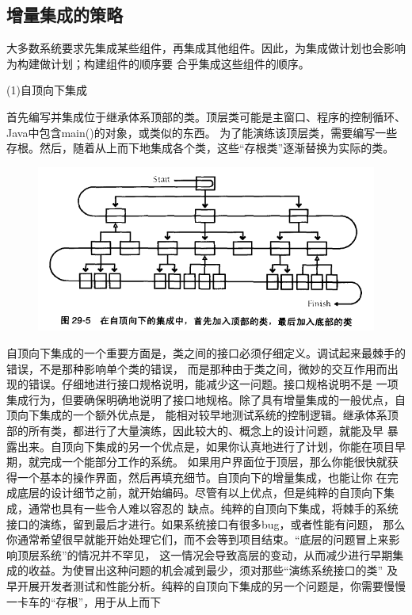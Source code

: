 \documentclass{article}
\begin{document}
\subsection{增量集成的策略}
大多数系统要求先集成某些组件，再集成其他组件。因此，为集成做计划也会影响为构建做计划；构建组件的顺序要
合乎集成这些组件的顺序。
\par
(1)自顶向下集成
\par
首先编写并集成位于继承体系顶部的类。顶层类可能是主窗口、程序的控制循环、Java中包含main()的对象，或类似的东西。
为了能演练该顶层类，需要编写一些存根。然后，随着从上而下地集成各个类，这些“存根类”逐渐替换为实际的类。
\begin{figure}[htb]
    \centering
    \includegraphics[width=15cm]{figure24.png}
\end{figure}
自顶向下集成的一个重要方面是，类之间的接口必须仔细定义。调试起来最棘手的错误，不是那种影响单个类的错误，
而是那种由于类之间，微妙的交互作用而出现的错误。仔细地进行接口规格说明，能减少这一问题。接口规格说明不是
一项集成行为，但要确保明确地说明了接口地规格。除了具有增量集成的一般优点，自顶向下集成的一个额外优点是，
能相对较早地测试系统的控制逻辑。继承体系顶部的所有类，都进行了大量演练，因此较大的、概念上的设计问题，就能及早
暴露出来。自顶向下集成的另一个优点是，如果你认真地进行了计划，你能在项目早期，就完成一个能部分工作的系统。
如果用户界面位于顶层，那么你能很快就获得一个基本的操作界面，然后再填充细节。自顶向下的增量集成，也能让你
在完成底层的设计细节之前，就开始编码。尽管有以上优点，但是纯粹的自顶向下集成，通常也具有一些令人难以容忍的
缺点。纯粹的自顶向下集成，将棘手的系统接口的演练，留到最后才进行。如果系统接口有很多bug，或者性能有问题，
那么你通常希望很早就能开始处理它们，而不会等到项目结束。“底层的问题冒上来影响顶层系统”的情况并不罕见，
这一情况会导致高层的变动，从而减少进行早期集成的收益。为使冒出这种问题的机会减到最少，须对那些“演练系统接口的类”
及早开展开发者测试和性能分析。纯粹的自顶向下集成的另一个问题是，你需要慢慢一卡车的“存根”，用于从上而下
\end{document}
